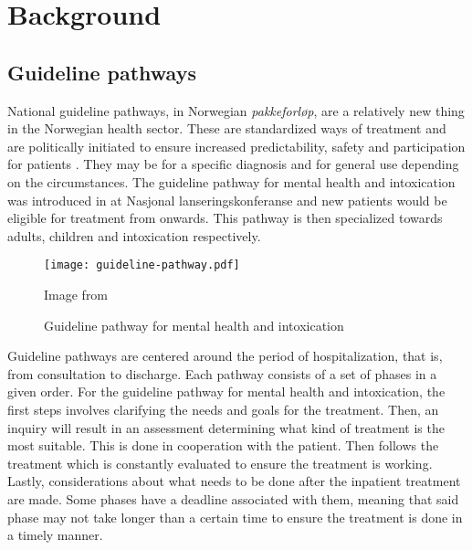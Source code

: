 \chapter{Background}
\label{ch:background}



\section{Guideline pathways}
\label{sec:pathways}

National guideline pathways, in Norwegian \emph{pakkeforløp}, are a relatively new thing in the Norwegian health sector. These are standardized ways of treatment and are politically initiated to ensure increased predictability, safety and participation for patients \autocite{helsedirektoratet2019}. They may be for a specific diagnosis and for general use depending on the circumstances. The guideline pathway for mental health and intoxication was introduced in  at Nasjonal lanseringskonferanse \autocite{haugland2018} and new patients would be eligible for treatment from  onwards. This pathway is then specialized towards adults, children and intoxication respectively. %

\begin{figure}
    \centering
    \texttt{[image: guideline-pathway.pdf]}
    \caption{Guideline pathway for mental health and intoxication}
    Image from \textcite{haugland2018}
    \label{fig:guideline-pathway}
\end{figure}

Guideline pathways are centered around the period of hospitalization, that is, from consultation to discharge. Each pathway consists of a set of phases in a given order. For the guideline pathway for mental health and intoxication, the first steps involves clarifying the needs and goals for the treatment. Then, an inquiry will result in an assessment determining what kind of treatment is the most suitable. This is done in cooperation with the patient. Then follows the treatment which is constantly evaluated to ensure the treatment is working. Lastly, considerations about what needs to be done after the inpatient treatment are made. Some phases have a deadline associated with them, meaning that said phase may not take longer than a certain time to ensure the treatment is done in a timely manner.

